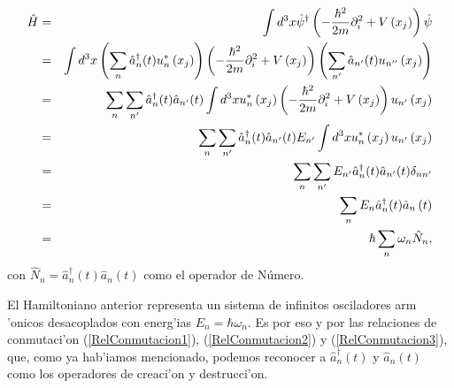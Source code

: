 \begin{eqnarray}
\hat{H} &=&\int d^{3}x\hat{\psi}^{\dagger }\left( -\frac{\hbar ^{2}}{2m}%
\partial _{i}^{2}+V\left( x_{j}\right) \right) \hat{\psi} \notag \\
&=&\int d^{3}x\left( \sum_{n}\hat{a}_{n}^{\dagger }(t)
u_{n}^{\ast }\left( x_{j}\right) \right) \left( -\frac{\hbar ^{2}}{2m}%
\partial _{i}^{2}+V\left( x_{j}\right) \right) \left( \sum_{n'}\hat{a}_{n'}(t)
u_{n''}\left( x_{j}\right) \right) \notag \\
&=&\sum_{n}\sum_{n'}\hat{a}_{n}^{\dagger }(t) \hat{a}_{n'}(t) \int
d^{3}xu_{n}^{\ast }\left( x_{j}\right) \left( -\frac{%
\hbar ^{2}}{2m}\partial _{i}^{2}+V\left( x_{j}\right) \right) u_{n'}\left(
x_{j}\right) \notag \\
&=&\sum_{n}\sum_{n'}\hat{a}_{n}^{\dagger }(t) \hat{a}_{n'}(t) E_{n'}\int
d^{3}xu_{n}^{\ast }\left( x_{j}\right) u_{n'}\left( x_{j}\right) \notag \\
&=&\sum_{n}\sum_{n'}E_{n'}\hat{a}_{n}^{\dagger }(t) \hat{a}_{n'}(t) \delta
_{nn'} \notag \\
&=&\sum_{n}E_{n}\hat{a}_{n}^{\dagger }(t) \hat{a}_{n}\left(
t\right) \notag \\
&=&\hbar \sum_{n}\omega _{n}\hat{N}_{n},
\label{OperadorHamiltonianodeSchrodinger2}
\end{eqnarray}%
con $\hat{N}_{n}=\hat{a}_{n}^{\dagger }(t) \hat{a}_{n}\left(
t\right) $ como el operador de Número.

El Hamiltoniano anterior representa un sistema de infinitos osciladores arm%
'onicos desacoplados con energ'ias $E_{n}=\hbar \omega _{n}.$ Es por
eso y por las relaciones de conmutaci'on (\ref{RelConmutacion1}), (\ref{RelConmutacion2}) y (\ref{RelConmutacion3}), que, como ya hab'iamos
mencionado, podemos reconocer a $\hat{a}_{n}^{\dagger }(t) $ y $%
\hat{a}_{n}(t) $ como los operadores de creaci'on y destrucci'on.
